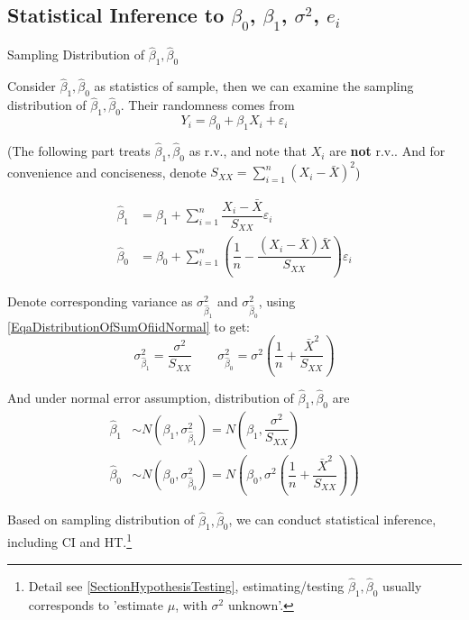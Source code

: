\subsection{Statistical Inference to $ \beta _0 $, $ \beta _1 $, $ \sigma ^2 $, $ e_i $}

\begin{point}
    Sampling Distribution of $ \hat{\beta} _1,\hat{\beta} _0  $
\end{point}

    Consider $ \hat{\beta} _1,\hat{\beta} _0 $ as statistics of sample, then we can examine the sampling distribution of $  \hat{\beta} _1,\hat{\beta} _0 $. Their randomness comes from
    \begin{equation}
        Y_i=\beta_0+\beta_1X_i+\varepsilon _i 
    \end{equation}
    
    

    (The following part treats $\hat{\beta} _1,\hat{\beta} _0 $ as r.v., and note that $ X_i $ are \textbf{not }r.v.. And  for convenience and conciseness, denote $ S_{XX}={\displaystyle\sum_{i=1}^n(X_i-\bar{X})^2} $)

   
\begin{align*}
        \hat{\beta }_1&=\beta _1+\sum_{i=1}^n\dfrac{X_i-\bar{X}}{S_{XX}}\varepsilon _i\\
        \hat{\beta }_0&=\beta _0+\sum_{i=1}^n\left(\dfrac{1}{n}-\dfrac{(X_i-\bar{X})\bar{X}}{S_{XX}}\right)\varepsilon _i
\end{align*}
 
    Denote corresponding variance as $ \sigma^2_{\hat{\beta}_1} $ and $ \sigma^2_{\hat{\beta}_0} $, using \autoref{EqaDistributionOfSumOfiidNormal} to get:
    \begin{equation}
        \sigma^2_{\hat{\beta}_1}= \dfrac{\sigma^2}{S_{XX}}\qquad \sigma^2_{\hat{\beta}_0}=\sigma^2(\dfrac{1}{n}+\dfrac{\bar{X}^2}{S_{XX}})
    \end{equation} 
    
     And under normal error assumption, distribution of $ \hat{\beta} _1,\hat{\beta} _0  $ are
    \begin{align*}
        \hat{\beta }_1&\sim N(\beta _1,\sigma^2_{\hat{\beta}_1}) =N(\beta_1,\dfrac{\sigma^2}{S_{XX}})\\
        \hat{\beta}_0&\sim N(\beta_0,\sigma^2_{\hat{\beta }_0}) =N(\beta_0,\sigma^2(\dfrac{1}{n}+\dfrac{\bar{X}^2}{S_{XX}}))
    \end{align*}
    
    Based on sampling distribution of $ \hat{\beta} _1,\hat{\beta} _0  $, we can conduct statistical inference, including CI and HT.\footnote{Detail see \autoref{SectionHypothesisTesting}, estimating/testing $ \hat{\beta} _1,\hat{\beta} _0  $ usually corresponds to 'estimate $ \mu $, with $ \sigma^2 $ unknown'.}
    
